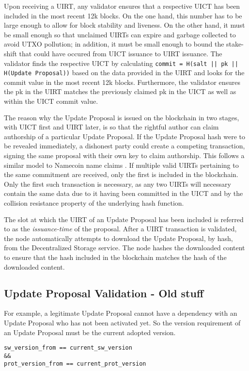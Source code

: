 Upon receiving a UIRT, any validator ensures that a respective UICT has been included in the most recent 12k blocks. On the one hand, this number has to be large enough to allow for block stability and liveness. On the other hand, it must be small enough so that unclaimed UIRTs can expire and garbage collected to avoid UTXO pollution; in addition, it must be small enough to bound the stake-shift that could have occured from UICT issuance to UIRT issuance. The validator finds the respective UICT by calculating 
\verb;commit = H(salt || pk || H(Update Proposal));  based on the data provided in the UIRT and looks for the commit value in the most recent 12k blocks. Furthermore, the validator ensures the pk in the UIRT matches the previously claimed pk in the UICT as well as within the UICT commit value.

The reason why the Update Proposal is issued on the blockchain in two stages, with UICT first and UIRT later, is so that the rightful author can claim authorship of a particular Update Proposal. If the Update Proposal hash were to be revealed immediately, a dishonest party could create a competing transaction, signing the same proposal with their own key to claim authorship. This follows a similar model to Namecoin name claims \cite{Namecoin}. If multiple valid UIRTs pertaining to the same commitment are received, only the first is included in the blockchain. Only the first such transaction is necessary, as any two UIRTs will necessary contain the same data due to it having been committed in the UICT and by the collision resistance property of the underlying hash function.

The slot at which the UIRT of an Update Proposal has been included is referred to as the \emph{issuance-time} of the proposal. After a UIRT transaction is validated, the node automatically attempts to download the Update Proposal, by hash, from the Decentralized Storage service. The node hashes the downloaded content to ensure that the hash included in the blockchain matches the hash of the downloaded content.

\subsection*{Update Proposal Validation  - Old stuff}
For example, a legitimate Update Proposal cannot have a dependency with an Update Proposal who has not been activated yet. So the version requirement of an Update Proposal must be the current adopted version.
\begin{verbatim}
sw_version_from == current_sw_version 
&&
prot_version_from == current_prot_version
\end{verbatim}

